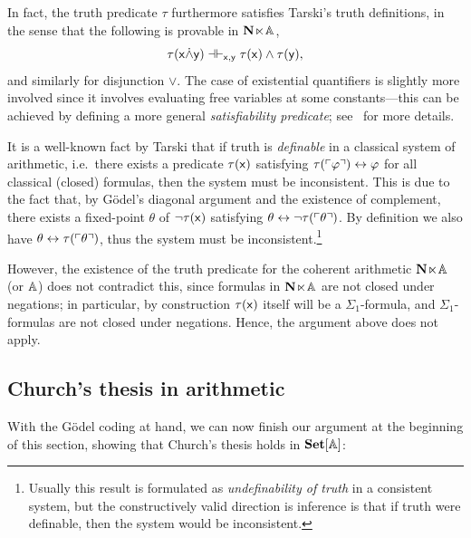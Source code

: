 \begin{remark}\label{rem:truthpredTarski}
  In fact, the truth predicate $\tau$ furthermore satisfies Tarski's truth definitions, in the sense that the following is provable in $\mathbf N\hspace{-.4ex}\ltimes\hspace{-.4ex}\mathbb{A}$,
  \[ \tau(\mathsf{x} \dot\wedge \mathsf{y}) \dashv\vdash_{\mathsf{x},\mathsf{y}} \tau(\mathsf{x}) \wedge \tau(\mathsf{y}), \]
  and similarly for disjunction $\vee$. The case of existential quantifiers is slightly more involved since it involves evaluating free variables at some constants---this can be achieved by defining a more general \emph{satisfiability predicate}; see~\citet[\S I.1.(d)]{Hájek_Pudlák_2017} for more details.
\end{remark}

\begin{remark}
  It is a well-known fact by Tarski that if truth is \emph{definable} in a classical system of arithmetic, i.e.\ there exists a predicate $\tau(\mathsf{x})$ satisfying $\tau(\ulcorner \varphi \urcorner) \leftrightarrow \varphi$ for all classical (closed) formulas, then the system must be inconsistent. This is due to the fact that, by G\"odel's diagonal argument and the existence of complement, there exists a fixed-point $\theta$ of $\neg\tau(\mathsf{x})$ satisfying $\theta \leftrightarrow \neg\tau(\ulcorner \theta \urcorner)$. By definition we also have $\theta \leftrightarrow \tau(\ulcorner \theta \urcorner)$, thus the system must be inconsistent.\footnote{Usually this result is formulated as \emph{undefinability of truth} in a consistent system, but the constructively valid direction is inference is that if truth were definable, then the system would be inconsistent.}

  However, the existence of the truth predicate for the coherent arithmetic $\mathbf N\hspace{-.4ex}\ltimes\hspace{-.4ex}\mathbb{A}$ (or $\mathbb{A}$) does not contradict this, since formulas in $\mathbf N\hspace{-.4ex}\ltimes\hspace{-.4ex}\mathbb{A}$ are not closed under negations; in particular, by construction $\tau(\mathsf{x})$ itself will be a $\Sigma_1$-formula, and $\Sigma_1$-formulas are not closed under negations. Hence, the argument above does not apply. 
\end{remark}

\subsection{Church's thesis in arithmetic}\label{subsec:churchthesis}

With the G\"odel coding at hand, we can now finish our argument at the beginning of this section, showing that Church's thesis holds in $\mathbf{Set}[\mathbb{A}]$:

